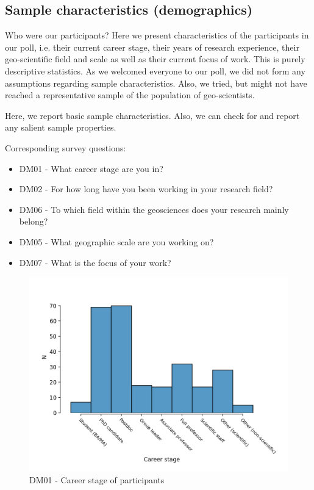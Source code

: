 \documentclass{article}
\begin{document}
\subsection{Sample characteristics (demographics)}
Who were our participants?
Here we present characteristics of the participants in our poll, i.e. their current career stage, their years of research experience, their geo-scientific field and scale as well as their current focus of work.
This is purely descriptive statistics.
As we welcomed everyone to our poll, we did not form any assumptions regarding sample characteristics.
Also, we tried, but might not have reached a representative sample of the population of geo-scientists.

Here, we report basic sample characteristics. Also, we can check for and report any salient sample properties.

Corresponding survey questions:

\begin{itemize}
	\item DM01 - What career stage are you in?
	\item DM02 - For how long have you been working in your research field?
	\item DM06 - To which field within the geosciences does your research mainly belong?
	\item DM05 - What geographic scale are you working on?
	\item DM07 - What is the focus of your work?
\end{itemize}

\begin{figure}[!p]
    \centering
    \includegraphics[width=\textwidth]{../figs/DM01.png}
	\caption{DM01 - Career stage of participants}
    \label{fig:dm01}
\end{figure}
\end{document}
